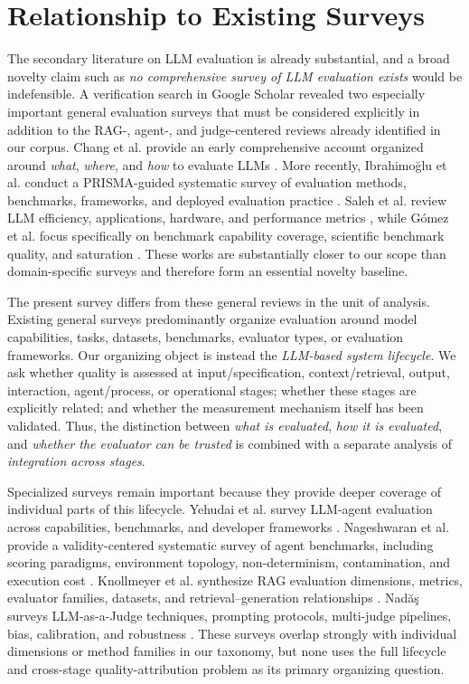 \section{Relationship to Existing Surveys}
\label{sec:prior-surveys}

The secondary literature on LLM evaluation is already substantial, and a broad novelty claim such as \emph{no comprehensive survey of LLM evaluation exists} would be indefensible. A verification search in Google Scholar revealed two especially important general evaluation surveys that must be considered explicitly in addition to the RAG-, agent-, and judge-centered reviews already identified in our corpus. Chang et al. provide an early comprehensive account organized around \emph{what}, \emph{where}, and \emph{how} to evaluate LLMs \cite{chang2024evaluation}. More recently, Ibrahimo\u{g}lu et al. conduct a PRISMA-guided systematic survey of evaluation methods, benchmarks, frameworks, and deployed evaluation practice \cite{ibrahimoglu2026systematic}. Saleh et al. review LLM efficiency, applications, hardware, and performance metrics \cite{saleh2025evaluating}, while G\'{o}mez et al. focus specifically on benchmark capability coverage, scientific benchmark quality, and saturation \cite{gomez2026benchmarks}. These works are substantially closer to our scope than domain-specific surveys and therefore form an essential novelty baseline.

The present survey differs from these general reviews in the unit of analysis. Existing general surveys predominantly organize evaluation around model capabilities, tasks, datasets, benchmarks, evaluator types, or evaluation frameworks. Our organizing object is instead the \emph{LLM-based system lifecycle}. We ask whether quality is assessed at input/specification, context/retrieval, output, interaction, agent/process, or operational stages; whether these stages are explicitly related; and whether the measurement mechanism itself has been validated. Thus, the distinction between \emph{what is evaluated}, \emph{how it is evaluated}, and \emph{whether the evaluator can be trusted} is combined with a separate analysis of \emph{integration across stages}.

Specialized surveys remain important because they provide deeper coverage of individual parts of this lifecycle. Yehudai et al. survey LLM-agent evaluation across capabilities, benchmarks, and developer frameworks \cite{yehudai2026surveyagents}. Nageshwaran et al. provide a validity-centered systematic survey of agent benchmarks, including scoring paradigms, environment topology, non-determinism, contamination, and execution cost \cite{nageshwaran2026agent}. Knollmeyer et al. synthesize RAG evaluation dimensions, metrics, evaluator families, datasets, and retrieval--generation relationships \cite{knollmeyer2026rag}. Nad\u{a}\c{s} surveys LLM-as-a-Judge techniques, prompting protocols, multi-judge pipelines, bias, calibration, and robustness \cite{nadas2026judges}. These surveys overlap strongly with individual dimensions or method families in our taxonomy, but none uses the full lifecycle and cross-stage quality-attribution problem as its primary organizing question.

